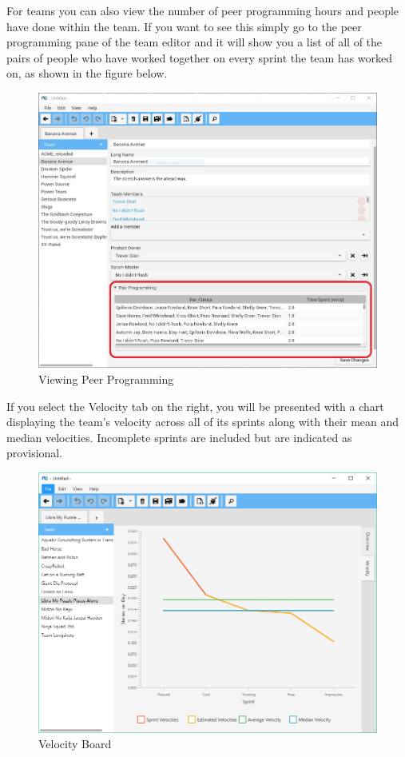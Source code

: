 For teams you can also view the number of peer programming hours and people have done within the team. If you want to see this simply go to the peer programming pane of the team editor and it will show you a list of all of the pairs of people who have worked together on every sprint the team has worked on, as shown in the figure below.

\begin{figure}[H]
\centering
\includegraphics[width=\textwidth]{images/screenshots/teams6.PNG}
\caption{Viewing Peer Programming}
\label{fig:new_project}
\end{figure}

If you select the Velocity tab on the right, you will be presented with a chart displaying the team's velocity across all of its sprints along with their mean and median velocities. Incomplete sprints are included but are indicated as provisional.

\begin{figure}[H]
\centering
\includegraphics[width=\textwidth]{images/screenshots/velocity_board.PNG}
\caption{Velocity Board}
\label{fig:new_project}
\end{figure}